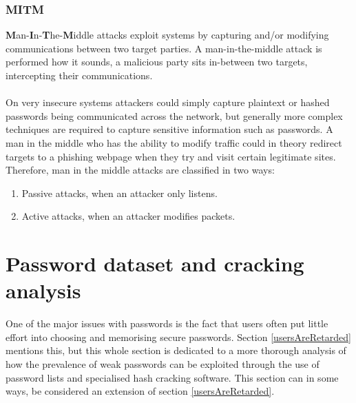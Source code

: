 \documentclass[11pt]{article}
\begin{document}
\subsubsection{MITM}
\textbf{M}an-\textbf{I}n-\textbf{T}he-\textbf{M}iddle attacks exploit systems by capturing and/or modifying communications between two target parties.
A man-in-the-middle attack is performed how it sounds, a malicious party sits in-between two targets, intercepting their communications.\\\\
On very insecure systems attackers could simply capture plaintext or hashed passwords being communicated across the network, but generally more complex techniques are required to capture sensitive information such as passwords. A man in the middle who has the ability to modify traffic could in theory redirect targets to a phishing webpage when they try and visit certain legitimate sites.
Therefore, man in the middle attacks are classified in two ways:
\begin{enumerate}
\item Passive attacks, when an attacker only listens.
\item Active attacks, when an attacker modifies packets.
\end{enumerate}




\section{Password dataset and cracking analysis}
One of the major issues with passwords is the fact that users often put little effort into choosing and memorising secure passwords.
Section \ref{usersAreRetarded} mentions this, but this whole section is dedicated to a more thorough analysis of how the prevalence of weak passwords can be exploited through the use of password lists and specialised hash cracking software.
This section can in some ways, be considered an extension of section \ref{usersAreRetarded}.
\end{document}
